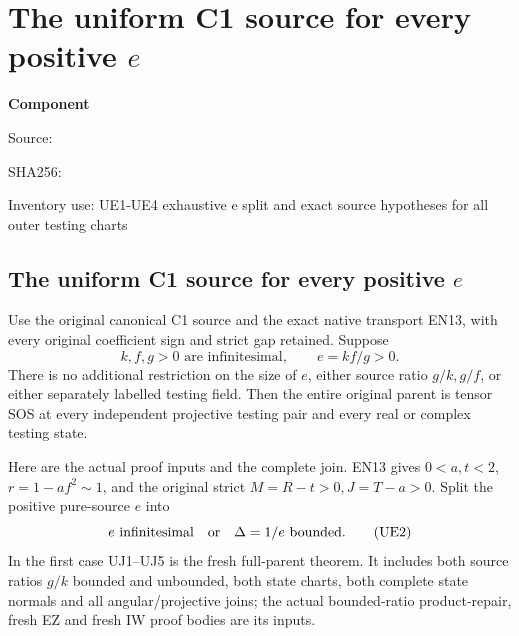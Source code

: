 \chapter{The uniform C1 source for every positive \(e\)}
\label{component:pf5d2f33f694c}
\noindent\textbf{Component }\par
{\small\noindent Source: \par}
{\small\noindent SHA256: \par}
{\small\noindent Inventory use: UE1-UE4 exhaustive e split and exact source hypotheses for all outer testing charts\par}
\medskip
\section{The uniform C1 source for every positive \(e\)}
\label{pf5d2f33f694c:sec:uniform-c1-all-e-rederived}

Use the original canonical C1 source and the exact native transport
EN13, with every original coefficient sign and strict gap retained.
Suppose
\[
 k,f,g>0\text{ are infinitesimal},\qquad e=kf/g>0 .
 \tag{UE1}
\]
There is no additional restriction on the size of \(e\), either
source ratio \(g/k,g/f\), or either separately labelled testing field.
Then the entire original parent is tensor SOS at every independent
projective testing pair and every real or complex testing state.

Here are the actual proof inputs and the complete join.  EN13 gives
\(0<a,t<2\), \(r=1-af^2\sim1\), and the original strict
\(M=R-t>0,J=T-a>0\).  Split the positive pure-source \(e\) into
\[
 e\text{ infinitesimal}\quad\hbox{or}\quad \Delta=1/e\text{ bounded}.
 \tag{UE2}
\]
In the first case UJ1--UJ5 is the fresh full-parent theorem.  It
includes both source ratios \(g/k\) bounded and unbounded, both
state charts, both complete state normals and all angular/projective
joins; the actual bounded-ratio product-repair, fresh EZ and fresh
IW proof bodies are its inputs.

